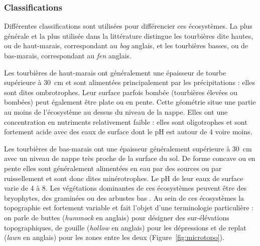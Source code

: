 \subsubsection{Classifications}

Différentes classifications sont utilisées pour différencier ces écosystèmes.
La plus générale et la plus utilisée dans la littérature distingue les tourbières dite hautes, ou de haut-marais, correspondant au \textit{bog} anglais, et les tourbières basses, ou de bas-marais, correspondant au \textit{fen} anglais.

Les tourbières de haut-marais ont généralement une épaisseur de tourbe supérieure à \SI{30}{\cm} et sont alimentées principalement par les précipitations : elles sont dites ombrotrophes.
Leur surface parfois bombée (tourbières élevées ou bombées) peut également être plate ou en pente.
Cette géométrie situe une partie au moins de l'écosystème au dessus du niveau de la nappe.
Elles ont une concentration en nutriments relativement faible : elles sont oligotrophes et sont fortement acide avec des eaux de surface dont le pH est autour de 4 voire moins.

Les tourbières de bas-marais ont une épaisseur généralement supérieure à \SI{30}{\cm} avec un niveau de nappe très proche de la surface du sol.
De forme concave ou en pente elles sont généralement alimentées en eau par des sources ou par ruissellement et sont donc dites minérotrophes.
Le pH de leur eaux de surface varie de 4 à 8.
Les végétations dominantes de ces écosystèmes peuvent être des bryophytes, des graminées ou des arbustes bas \citep{rydin2013a}.
Au sein de ces écosystèmes la topographie est fortement variable et fait l'objet d'une terminologie particulière : on parle de buttes (\textit{hummock} en anglais) pour désigner des sur-élévations topographiques, de gouille (\textit{hollow} en anglais) pour les dépressions et de replat (\textit{lawn} en anglais) pour les zones entre les deux (Figure~\ref{fig:microtopo}).


